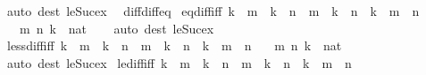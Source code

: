 \begin{isabellebody}
\isamarkupfalse%
\ {\isacharparenleft}{\kern0pt}auto\ dest{\isacharbang}{\kern0pt}{\isacharcolon}{\kern0pt}\ le{\isacharunderscore}{\kern0pt}Suc{\isacharunderscore}{\kern0pt}ex{\isacharparenright}{\kern0pt}%
\endisatagproof
{\isafoldproof}%
%
\isadelimproof
\isanewline
%
\endisadelimproof
\isanewline
{}\isamarkupfalse%
\ {\isacharparenleft}{\kern0pt}\ diff{\isacharunderscore}{\kern0pt}diff{\isacharunderscore}{\kern0pt}eq\isanewline
\isanewline
{}\isamarkupfalse%
\ eq{\isacharunderscore}{\kern0pt}diff{\isacharunderscore}{\kern0pt}iff{\isacharcolon}{\kern0pt}\ {\isachardoublequoteopen}k\ {\isasymle}\ m\ {\isasymLongrightarrow}\ k\ {\isasymle}\ n\ {\isasymLongrightarrow}\ m\ {\isacharminus}{\kern0pt}\ k\ {\isacharequal}{\kern0pt}\ n\ {\isacharminus}{\kern0pt}\ k\ {\isasymlongleftrightarrow}\ m\ {\isacharequal}{\kern0pt}\ n{\isachardoublequoteclose}\isanewline
\ \ \ m\ n\ k\ {\isacharcolon}{\kern0pt}{\isacharcolon}{\kern0pt}\ nat\isanewline
%
\isadelimproof
\ \ %
\endisadelimproof
%
\isatagproof
{}\isamarkupfalse%
\ {\isacharparenleft}{\kern0pt}auto\ dest{\isacharcolon}{\kern0pt}\ le{\isacharunderscore}{\kern0pt}Suc{\isacharunderscore}{\kern0pt}ex{\isacharparenright}{\kern0pt}%
\endisatagproof
{\isafoldproof}%
%
\isadelimproof
\isanewline
%
\endisadelimproof
\isanewline
{}\isamarkupfalse%
\ less{\isacharunderscore}{\kern0pt}diff{\isacharunderscore}{\kern0pt}iff{\isacharcolon}{\kern0pt}\ {\isachardoublequoteopen}k\ {\isasymle}\ m\ {\isasymLongrightarrow}\ k\ {\isasymle}\ n\ {\isasymLongrightarrow}\ m\ {\isacharminus}{\kern0pt}\ k\ {\isacharless}{\kern0pt}\ n\ {\isacharminus}{\kern0pt}\ k\ {\isasymlongleftrightarrow}\ m\ {\isacharless}{\kern0pt}\ n{\isachardoublequoteclose}\isanewline
\ \ \ m\ n\ k\ {\isacharcolon}{\kern0pt}{\isacharcolon}{\kern0pt}\ nat\isanewline
%
\isadelimproof
\ \ %
\endisadelimproof
%
\isatagproof
{}\isamarkupfalse%
\ {\isacharparenleft}{\kern0pt}auto\ dest{\isacharbang}{\kern0pt}{\isacharcolon}{\kern0pt}\ le{\isacharunderscore}{\kern0pt}Suc{\isacharunderscore}{\kern0pt}ex{\isacharparenright}{\kern0pt}%
\endisatagproof
{\isafoldproof}%
%
\isadelimproof
\isanewline
%
\endisadelimproof
\isanewline
{}\isamarkupfalse%
\ le{\isacharunderscore}{\kern0pt}diff{\isacharunderscore}{\kern0pt}iff{\isacharcolon}{\kern0pt}\ {\isachardoublequoteopen}k\ {\isasymle}\ m\ {\isasymLongrightarrow}\ k\ {\isasymle}\ n\ {\isasymLongrightarrow}\ m\ {\isacharminus}{\kern0pt}\ k\ {\isasymle}\ n\ {\isacharminus}{\kern0pt}\ k\ {\isasymlongleftrightarrow}\ m\ {\isasymle}\ n{\isachardoublequoteclose}\isanewline

\end{isabellebody}

